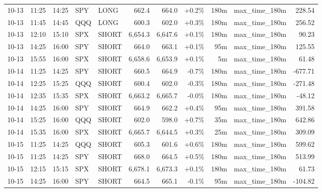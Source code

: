 \documentclass[11pt,a4paper,twoside]{article}
\begin{document}
\begin{center}
\begin{longtable}{>{\color{txtmain}}l l l l l r r r r >{\color{txtmain}}l r}
10-13 & 11:25 & 14:25 & SPY & LONG & 662.4 & 664.0 & \textcolor{wingreen}{+0.2\%} & 180m & max\_time\_180m & \textcolor{wingreen}{228.54} \\
10-13 & 11:45 & 14:45 & QQQ & LONG & 600.3 & 602.0 & \textcolor{wingreen}{+0.3\%} & 180m & max\_time\_180m & \textcolor{wingreen}{256.52} \\
10-13 & 12:10 & 15:10 & SPX & SHORT & 6,654.3 & 6,647.6 & \textcolor{wingreen}{+0.1\%} & 180m & max\_time\_180m & \textcolor{wingreen}{90.23} \\
10-13 & 14:25 & 16:00 & SPY & SHORT & 664.0 & 663.1 & \textcolor{wingreen}{+0.1\%} & 95m & max\_time\_180m & \textcolor{wingreen}{125.55} \\
10-13 & 15:55 & 16:00 & SPX & SHORT & 6,658.6 & 6,653.9 & \textcolor{wingreen}{+0.1\%} & 5m & max\_time\_180m & \textcolor{wingreen}{61.48} \\
10-14 & 11:25 & 14:25 & SPY & SHORT & 660.5 & 664.9 & \textcolor{lossred}{-0.7\%} & 180m & max\_time\_180m & \textcolor{lossred}{-677.71} \\
10-14 & 12:25 & 15:25 & QQQ & SHORT & 600.4 & 602.0 & \textcolor{lossred}{-0.3\%} & 180m & max\_time\_180m & \textcolor{lossred}{-271.48} \\
10-14 & 12:35 & 15:35 & SPX & SHORT & 6,663.2 & 6,665.7 & \textcolor{lossred}{-0.0\%} & 180m & max\_time\_180m & \textcolor{lossred}{-48.12} \\
10-14 & 14:25 & 16:00 & SPY & SHORT & 664.9 & 662.2 & \textcolor{wingreen}{+0.4\%} & 95m & max\_time\_180m & \textcolor{wingreen}{391.58} \\
10-14 & 15:25 & 16:00 & QQQ & SHORT & 602.0 & 598.0 & \textcolor{wingreen}{+0.7\%} & 35m & max\_time\_180m & \textcolor{wingreen}{642.86} \\
10-14 & 15:35 & 16:00 & SPX & SHORT & 6,665.7 & 6,644.5 & \textcolor{wingreen}{+0.3\%} & 25m & max\_time\_180m & \textcolor{wingreen}{309.09} \\
10-15 & 11:25 & 14:25 & QQQ & SHORT & 605.3 & 601.6 & \textcolor{wingreen}{+0.6\%} & 180m & max\_time\_180m & \textcolor{wingreen}{599.62} \\
10-15 & 11:25 & 14:25 & SPY & SHORT & 668.0 & 664.5 & \textcolor{wingreen}{+0.5\%} & 180m & max\_time\_180m & \textcolor{wingreen}{513.99} \\
10-15 & 12:15 & 15:15 & SPX & SHORT & 6,678.1 & 6,673.3 & \textcolor{wingreen}{+0.1\%} & 180m & max\_time\_180m & \textcolor{wingreen}{61.73} \\
10-15 & 14:25 & 16:00 & SPY & SHORT & 664.5 & 665.1 & \textcolor{lossred}{-0.1\%} & 95m & max\_time\_180m & \textcolor{lossred}{-104.82} \\

\end{longtable}
\end{center}
\end{document}

